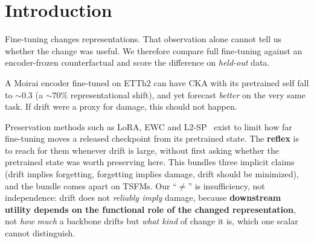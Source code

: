 \documentclass{article}
\begin{document}
\section{Introduction}
\label{sec:intro}

Fine-tuning changes representations. That observation alone cannot tell us whether the change was
useful. We therefore compare full fine-tuning against an encoder-frozen counterfactual and score the
difference on \emph{held-out} data.

A Moirai encoder fine-tuned on ETTh2 can have CKA with its pretrained self fall to ${\sim}0.3$ (a ${\sim}70\%$ representational shift), and yet forecast \emph{better} on the very same task.
If drift were a proxy for damage, this should not happen.

Preservation methods such as LoRA, EWC and L2-SP~\citep{kirkpatrick2017ewc,hu2022lora,li2018l2sp} exist to limit how far fine-tuning moves a released checkpoint from its pretrained state. The \textbf{reflex} is to reach for them whenever drift is large, without first asking whether the pretrained state was worth preserving here.
This bundles three implicit claims (drift implies forgetting, forgetting implies damage, drift should be minimized), and the bundle comes apart on TSFMs. Our ``$\neq$'' is insufficiency, not independence: drift does not \emph{reliably imply} damage, because \textbf{downstream utility depends on the functional role of the changed representation}, not \emph{how much} a backbone drifts but \emph{what kind} of change it is, which one scalar cannot distinguish.
\end{document}
